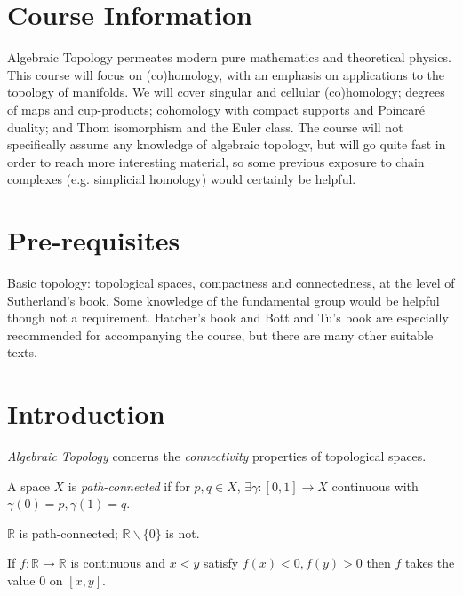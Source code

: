 \documentclass[a4paper,11pt]{article}
\begin{document}
	\maketitlepage
	\preliminaries

	\section*{Course Information}

	Algebraic Topology permeates modern pure mathematics and theoretical physics. This course will focus on (co)homology, with an emphasis on applications to the topology of manifolds. We will cover singular and cellular (co)homology; degrees of maps and cup-products; cohomology with compact supports and Poincar\'e duality; and Thom isomorphism and the Euler class. The course will not specifically assume any knowledge of algebraic topology, but will go quite fast in order to reach more interesting material, so some previous exposure to chain complexes (e.g. simplicial homology) would certainly be helpful.
	
	\section*{Pre-requisites}

	Basic topology: topological spaces, compactness and connectedness, at the level of Sutherland’s book. Some knowledge of the fundamental group would be helpful though not a requirement. Hatcher’s book and Bott and Tu’s book are especially recommended for accompanying the course, but there are many other suitable texts.

	\newpage
	\tableofcontents
	\newpage
	\maintext
	\setcounter{section}{-1}
	\section{Introduction} 
	
	\emph{Algebraic Topology} concerns the \emph{connectivity} properties of topological spaces.

	\begin{defi}
		A space $X$ is \emph{path-connected} if for $p,q\in X$, $\exists \gamma: [0,1] \to X$ continuous with $\gamma(0) = p, \gamma(1) = q$. 
	\end{defi}

	\begin{ex}
		$\mathbb{R}$ is path-connected; $\mathbb{R} \backslash \{0\}$ is not.
	\end{ex}

	\begin{cor}
		If $f : \mathbb{R} \to \mathbb{R}$ is continuous and $x < y$ satisfy $f(x)<0, f(y)>0$ then $f$ takes the value 0 on $[x,y]$.
	\end{cor}
\end{document}

